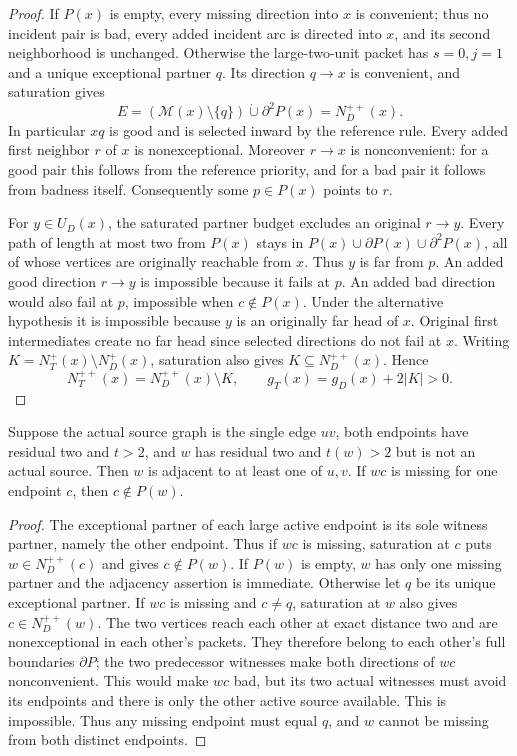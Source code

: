 \begin{proof}
If $P(x)$ is empty, every missing direction into $x$ is convenient;
thus no incident pair is bad, every added incident arc is directed
into $x$, and its second neighborhood is unchanged.
Otherwise the large-two-unit packet has $s=0,j=1$ and a unique
exceptional partner $q$. Its direction $q\to x$ is convenient,
and saturation gives
\[
 E=(\mathcal M(x)\setminus\{q\})\dot\cup\partial^2P(x)
   =N_D^{++}(x).
\]
In particular $xq$ is good and is selected inward by the reference
rule. Every added first neighbor $r$ of $x$ is nonexceptional.
Moreover $r\to x$ is nonconvenient: for a good pair this follows
from the reference priority, and for a bad pair it follows from
badness itself. Consequently some $p\in P(x)$ points to $r$.

For $y\in U_D(x)$, the saturated partner budget excludes an
original $r\to y$. Every path of length at most two from $P(x)$
stays in $P(x)\cup\partial P(x)\cup\partial^2P(x)$, all of
whose vertices are originally reachable from $x$. Thus $y$ is
far from $p$. An added good direction $r\to y$ is impossible
because it fails at $p$. An added bad direction would also fail
at $p$, impossible when $c\notin P(x)$. Under the alternative
hypothesis it is impossible because $y$ is an originally far head
of $x$. Original first intermediates create no far head since
selected directions do not fail at $x$.
Writing $K=N_T^+(x)\setminus N_D^+(x)$, saturation also gives
$K\subseteq N_D^{++}(x)$. Hence
\[
 N_T^{++}(x)=N_D^{++}(x)\setminus K,
 \qquad g_T(x)=g_D(x)+2|K|>0.
\]
\end{proof}

\begin{lemma}
\label{lem:eta222-inactive-adjacency}
Suppose the actual source graph is the single edge $uv$, both
endpoints have residual two and $t>2$, and $w$ has residual two
and $t(w)>2$ but is not an actual source. Then $w$ is adjacent
to at least one of $u,v$. If $wc$ is missing for one endpoint
$c$, then $c\notin P(w)$.
\end{lemma}

\begin{proof}
The exceptional partner of each large active endpoint is its sole
witness partner, namely the other endpoint. Thus if $wc$ is
missing, saturation at $c$ puts $w\in N_D^{++}(c)$ and gives
$c\notin P(w)$.
If $P(w)$ is empty, $w$ has only one missing partner and the
adjacency assertion is immediate. Otherwise let $q$ be its unique
exceptional partner. If $wc$ is missing and $c\ne q$, saturation
at $w$ also gives $c\in N_D^{++}(w)$. The two vertices reach
each other at exact distance two and are nonexceptional in each
other's packets. They therefore belong to each other's full
boundaries $\partial P$; the two predecessor witnesses make
both directions of $wc$ nonconvenient. This would make $wc$ bad,
but its two actual witnesses must avoid its endpoints and there is
only the other active source available. This is impossible.
Thus any missing endpoint must equal $q$, and $w$ cannot be
missing from both distinct endpoints.
\end{proof}

